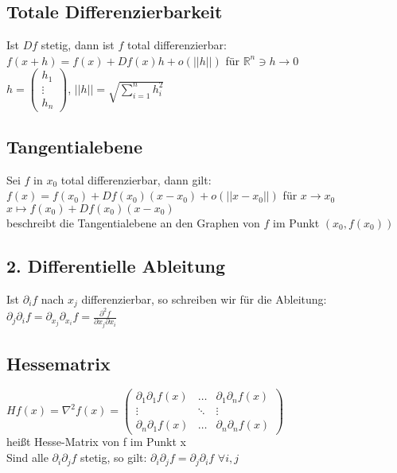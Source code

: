 \documentclass[a4paper,9pt]{extarticle}
\begin{document}
	\subsection*{Totale Differenzierbarkeit}
	Ist $Df$ stetig, dann ist $f$ total differenzierbar: \\
	$f(x + h) = f(x) + Df(x)h + o(||h||)$ für $\mathbb{R}^n \ni h → 0$ \\
	$h = \begin{pmatrix}
		h_1 \\
		\vdots \\
		h_n
	\end{pmatrix}$,
	$||h|| = \sqrt{\sum_{i = 1}^n h_i^2}$
	
	\subsection*{Tangentialebene}
	Sei $f$ in $x_0$ total differenzierbar, dann gilt: \\
	$f(x) = f(x_0) + Df(x_0)(x-x_0) + o(||x-x_0||)$ für $x → x_0$ \\
	
	$x \mapsto f(x_0) + Df(x_0)(x-x_0)$ \\
	beschreibt die Tangentialebene an den Graphen von $f$ im Punkt $(x_0,f(x_0))$
	
	\subsection*{2. Differentielle Ableitung}
	Ist $\partial_if$ nach $x_j$ differenzierbar, so schreiben wir für die Ableitung:\\
	$\partial_j\partial_i f = \partial_{x_j}\partial_{x_i}f = \frac{\partial^2f}{\partial x_j \partial x_i}$
	
	
	\subsection*{Hessematrix}
	$Hf(x) = \nabla^2f(x) = \begin{pmatrix}
		\partial_1\partial_1f(x) & \dots & \partial_1\partial_nf(x) \\
		\vdots & \ddots & \vdots \\
		\partial_n\partial_1f(x) & \dots & \partial_n\partial_nf(x)
	\end{pmatrix}$ \\
	heißt Hesse-Matrix von f im Punkt x \\
	
	Sind alle $\partial_i\partial_jf$ stetig, so gilt:
	$\partial_i\partial_jf = \partial_j\partial_if$ $\forall i,j$
	
\end{document}
